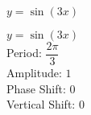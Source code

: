 {$y = \sin(3x)$}
{$y = \sin(3x)$\\
Period: $\dfrac{2\pi}{3}$\\
Amplitude: $1$\\
Phase Shift: $0$\\
Vertical Shift: $0$

\begin{center}
\end{center}
}
